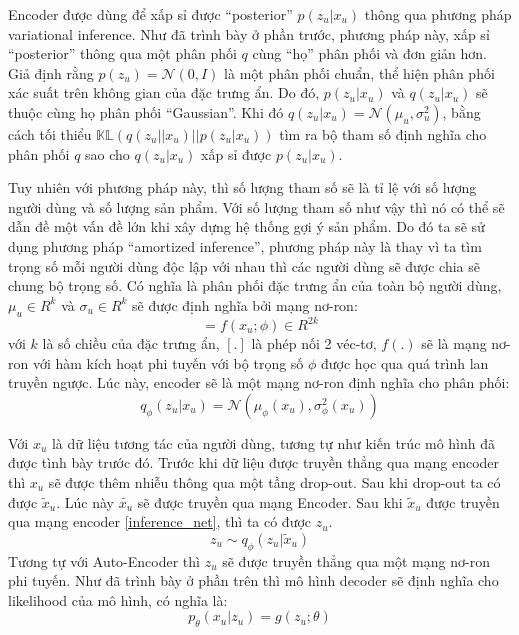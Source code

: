     Encoder được dùng để xấp sỉ được ``posterior'' $p(z_u|x_u)$ thông qua phương pháp variational inference. 
    Như đã trình bày ở phần trước, phương pháp này, xấp sỉ ``posterior'' thông qua một phân phối $q$ cùng ``họ'' phân phối và đơn giản hơn.
    Giả định rằng $p(z_u) = \mathcal{N}(0,I)$ là một phân phối chuẩn, thể hiện phân phối xác suất trên không gian của đặc trưng ẩn.
    Do đó, $p(z_u|x_u)$ và $q(z_u|x_u)$ sẽ thuộc cùng họ phân phối ``Gaussian''. 
    Khi đó $q(z_u|x_u) = \mathcal{N}(\mu_u,\sigma_u^2)$, bằng cách tối thiểu $\mathbb{KL}(q(z_u||x_u) || p(z_u|x_u))$ tìm ra bộ tham số định nghĩa cho phân phối $q$ sao cho $q(z_u | x_u)$ xấp sỉ được $p(z_u|x_u)$.    

    Tuy nhiên với phương pháp này, thì số lượng tham số sẽ là tỉ lệ với số lượng người dùng và số lượng sản phẩm.
    Với số lượng tham số như vậy thì nó có thể sẽ dẫn đề một vấn đề lớn khi xây dựng hệ thống gợi ý sản phẩm.
    Do đó ta sẽ sử dụng phương pháp ``amortized inference'', phương pháp này là thay vì ta tìm trọng số mỗi người dùng độc lập với nhau thì các người dùng sẽ được chia sẽ chung bộ trọng số.
    Có nghĩa là phân phối đặc trưng ẩn của toàn bộ người dùng, $\mu_u \in R^k $ và $\sigma_u \in R^k $ sẽ được định nghĩa bởi mạng nơ-ron:
    \begin{equation}
        [\mu_u,\sigma_u] = f(x_u;\phi) \in R^{2k}
    \end{equation}
    với $k$ là số chiều của đặc trưng ẩn, $[.]$ là phép nối 2 véc-tơ, $f(.)$ sẽ là mạng nơ-ron với hàm kích hoạt phi tuyến với bộ trọng số $\phi$ được học qua quá trình lan truyền ngược.
    Lúc này, encoder sẽ là một mạng nơ-ron định nghĩa cho phân phối:
    \begin{equation}
        \label{inference_net}
        q_\phi(z_u|x_u) = \mathcal{N}(\mu_\phi(x_u),\sigma^2_\phi(x_u))
    \end{equation}
    

    Với $x_u$ là dữ liệu tương tác của người dùng, tương tự như kiến trúc mô hình đã được tình bày trước đó.
    Trước khi dữ liệu được truyền thẳng qua mạng encoder thì $x_u$ sẽ được thêm nhiễu thông qua một tầng drop-out. 
    Sau khi drop-out ta có được $\tilde{x}_u$. 
    Lúc này $\tilde{x_u}$ sẽ được truyền qua mạng Encoder. 
    Sau khi $\tilde{x}_u$ được truyền qua mạng encoder \ref{inference_net}, thì ta có được $z_u$.
    \begin{equation}
        \label{sampling_zu}
        z_u \sim q_\phi(z_u|\tilde{x}_u)
    \end{equation}
    Tương tự với Auto-Encoder thì $z_u$ sẽ được truyền thẳng qua một mạng nơ-ron phi tuyến. 
    Như đã trình bày ở phần trên thì mô hình decoder sẽ định nghĩa cho likelihood của mô hình, có nghĩa là:
    \begin{equation}
        \label{generative_net}
        p_\theta(x_u|z_u) = g(z_u;\theta)
    \end{equation}

